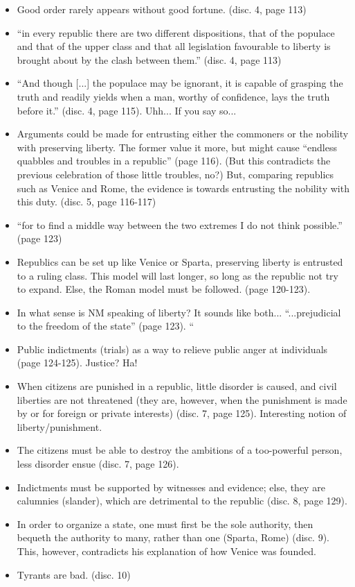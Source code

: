 \documentclass[11pt]{article}
\newcommand{\question}[1]{{\color{BurntOrange}#1}}
\newcommand{\comment}[1]{{\color{Cerulean}#1}}
\newcommand{\keyquote}[1]{{\color{BrickRed}#1}}
\newcommand{\p}{page }
\renewcommand{\d}{disc. }
\begin{document}
\begin{itemize}
{	legislating for a commonwealth it must needs be taken for granted that
	all men are wicked'' (\d 3, \p 112).
	}
\item
	Good order rarely appears without good fortune. (\d 4, \p 113)
\item
	\keyquote{``in every republic there are two different dispositions,
	that of the populace and that of the upper class and that all
	legislation favourable to liberty is brought about by the clash	
	between them.''} (\d 4, \p 113)
\item   
    ``And though [...] the populace may be ignorant, it is capable of 
    grasping the truth and readily yields when a man, worthy of confidence,
    lays the truth before it.'' (\d 4, \p 115). 
    \comment{Uhh... If you say so...}
\item
    Arguments could be made for entrusting either the commoners or the 
    nobility with preserving liberty. The former value it more, but 
    might cause ``endless quabbles and troubles in a republic'' (\p 116).
    (But this contradicts the previous celebration of those little 
    troubles, no?) But, comparing republics such as Venice and Rome, the
    evidence is towards entrusting the nobility with this duty. 
    (\d 5, \p 116-117)
\item
    ``for to find a middle way between the two extremes I do not think
    possible.'' (\p 123)
\item
    Republics can be set up like Venice or Sparta, preserving liberty
    is entrusted to a ruling class. This model will last longer, so
    long as the republic not try to expand. Else, the Roman model
    must be followed. (\p 120-123). 
\item 
    \question{In what sense is NM speaking of liberty? It sounds like
    both...} ``...prejudicial to the freedom of the state'' (\p 123). 
    ``
\item
    Public indictments (trials) as a way to relieve public anger 
    at individuals (\p 124-125). Justice? Ha!
\item   
    When citizens are punished in a republic, little disorder is
    caused, and civil liberties are not threatened (they are, however,
    when the punishment is made by or for foreign or private 
    interests) (\d 7, \p 125).
    \comment{Interesting notion of liberty/punishment.}     	
\item
    The citizens must be able to destroy the ambitions of a 
    too-powerful person, less disorder ensue (\d 7, \p 126).
\item
    Indictments must be supported by witnesses and evidence; else,
    they are calumnies (slander), which are detrimental to 
    the republic (\d 8, \p 129).
\item 
    In order to organize a state, one must first be the sole
    authority, then bequeth the authority to many, rather 
    than one (Sparta, Rome) (\d 9).
    \comment{This, however, contradicts
    his explanation of how Venice was founded.}   	
\item
    Tyrants are bad. (\d 10)    
\end{itemize}
\end{document}
